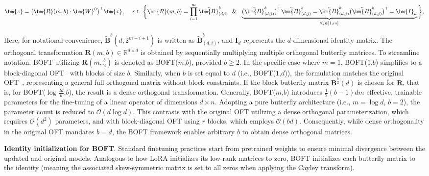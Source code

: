\begin{equation}
    \begin{aligned}\nonumber
    \bm{z}=\big(\bm{R}(m,b)\cdot\bm{W}^0\big)^\top\bm{x},~~~~\text{s.t.}~\bigg{\{}\bm{R}(m,b)=\prod_{i=1}^m \tilde{\bm{B}}^b_{(d,i)}~~\&~~\underbrace{\big(\tilde{\bm{B}}^b_{(d,j)}\big)^\top\tilde{\bm{B}}^b_{(d,j)}=\tilde{\bm{B}}^b_{(d,j)}\big(\tilde{\bm{B}}^b_{(d,j)}\big)^\top\!=\bm{I}_d}_{\forall j\in [1, m]}\bigg{\}},
    \end{aligned}
\end{equation}

Here, for notational convenience, $\tilde{\bm{B}}^b(d,2^{m - i+1})$ is written as $\tilde{\bm{B}}^b_{(d,i)}$, and $\bm{I}_d$ represents the $d$-dimensional identity matrix. The orthogonal transformation $\bm{R}(m,b)\in\mathbb{R}^{d\times d}$ is obtained by sequentially multiplying multiple orthogonal butterfly matrices. To streamline notation, BOFT utilizing $\bm{R}(m,\frac{b}{2})$ is denoted as BOFT($m$,$b$), provided $b\geq 2$. In the specific case where $m=1$, BOFT($1$,$b$) simplifies to a block-diagonal OFT~\cite{qiu2023controlling} with blocks of size $b$. Similarly, when $b$ is set equal to $d$ (i.e., BOFT($1$,$d$)), the formulation matches the original OFT~\cite{qiu2023controlling}, representing a general full orthogonal matrix without block constraints. If the block butterfly matrix $\bm{B}^{\frac{b}{2}}(d)$ is chosen for $\bm{R}$, that is, for BOFT($\log \frac{2d}{b}$,$b$), the result is a dense orthogonal transformation. Generally, BOFT($m$,$b$) introduces $\frac{1}{2}(b-1)dm$ effective, trainable parameters for the fine-tuning of a linear operator of dimensions $d\times n$. Adopting a pure butterfly architecture (i.e., $m=\log d$, $b=2$), the parameter count is reduced to $\mathcal{O}(d\log d)$. This contrasts with the original OFT utilizing a dense orthogonal parameterization, which requires $\mathcal{O}(d^2)$ parameters, and with block-diagonal OFT using $r$ blocks, which employs $\mathcal{O}(bd)$. Consequently, while dense orthogonality in the original OFT mandates $b=d$, the BOFT framework enables arbitrary $b$ to obtain dense orthogonal matrices.

\textbf{Identity initialization for BOFT}. Standard finetuning practices start from pretrained weights to ensure minimal divergence between the updated and original models. Analogous to how LoRA initializes its low-rank matrices to zero, BOFT initializes each butterfly matrix to the identity (meaning the associated skew-symmetric matrix is set to all zeros when applying the Cayley transform).

